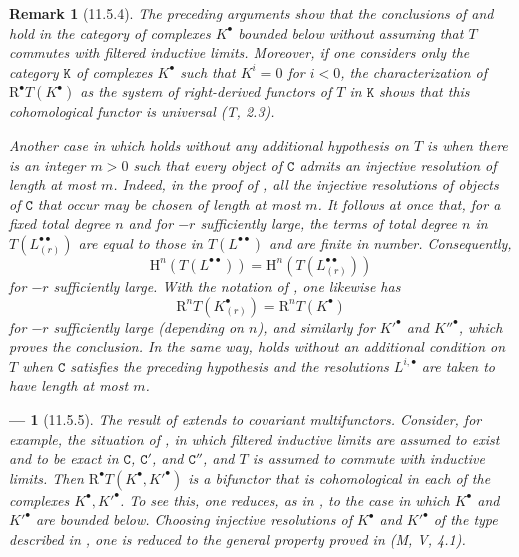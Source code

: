 \documentclass[oneside]{amsart}
\theoremstyle{ega-env-style}
\newtheorem*{env}{---}
\theoremstyle{ega-thm-env-style}
\theoremstyle{ega-defn-env-style}
\newtheorem*{remark}{Remark}
\def\cat{\mathtt}                   %
\def\HH{\mathrm{H}}                 %
\def\RR{\mathrm{R}}                 %
\newcommand{\oldpage}[2][]{{\marginnote{\normalfont{\textbf{#1}~|~#2}}}\ignorespaces}
\let\EGAOriginalLabel\label
\renewcommand{\label}[1]{\phantomsection\EGAOriginalLabel{#1}}
\begin{document}
\begin{remark}[11.5.4]
\label{0.11.5.4}
The preceding arguments show that the conclusions of  and  hold in the category of complexes $K^\bullet$ bounded below without assuming that $T$ commutes with filtered inductive limits.
Moreover, if one considers only the category $\cat{K}$ of complexes $K^\bullet$ such that $K^i=0$ for $i<0$, the characterization of $\RR^\bullet T(K^\bullet)$ as the system of right-derived functors of $T$ in $\cat{K}$ shows that this cohomological functor is \emph{universal} (T, 2.3).

Another case in which  holds without any additional hypothesis on $T$ is when there is an integer $m>0$ such that every object of $\cat{C}$ admits an injective resolution of length at most $m$.
Indeed, in the proof of , all the injective resolutions of objects of $\cat{C}$ that occur may be chosen of length at most $m$.
It follows at once that, for a fixed total degree $n$ and for $-r$ sufficiently large, the terms of total degree $n$ in $T(L^{\bullet\bullet}_{(r)})$ are equal to those in $T(L^{\bullet\bullet})$ and are finite in number.
Consequently,
\[
  \HH^n(T(L^{\bullet\bullet}))
  =\HH^n(T(L^{\bullet\bullet}_{(r)}))
\]
for $-r$ sufficiently large.
With the notation of , one likewise has
\[
  \RR^nT(K^\bullet_{(r)})=\RR^nT(K^\bullet)
\]
for $-r$ sufficiently large (depending on $n$), and similarly for $K'^\bullet$ and $K''^\bullet$, which proves the conclusion.
In the same way,  holds without an additional condition on $T$ when $\cat{C}$ satisfies the preceding hypothesis and the resolutions $L^{i,\bullet}$ are taken to have length at most $m$.
\end{remark}

\begin{env}[11.5.5]
\label{0.11.5.5}
The result of  extends to covariant multifunctors.
Consider, for example, the situation of , in which filtered inductive limits are assumed to exist and to be exact in $\cat{C}$, $\cat{C}'$, and $\cat{C}''$,
\oldpage[0\textsubscript{III}]{39}
and $T$ is assumed to commute with inductive limits.
Then $\RR^\bullet T(K^\bullet,K'^\bullet)$ is a bifunctor that is cohomological in each of the complexes $K^\bullet,K'^\bullet$.
To see this, one reduces, as in , to the case in which $K^\bullet$ and $K'^\bullet$ are bounded below.
Choosing injective resolutions of $K^\bullet$ and $K'^\bullet$ of the type described in , one is reduced to the general property proved in (M, V, 4.1).
\end{env}
\end{document}
